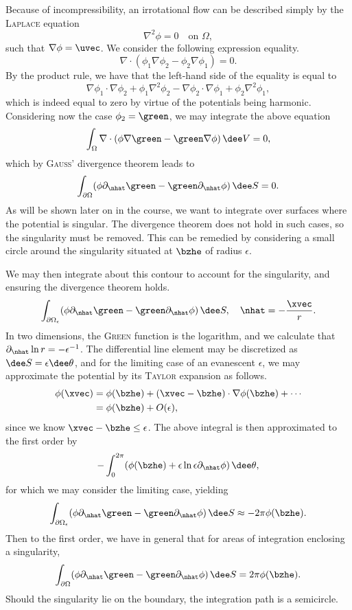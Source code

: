 Because of incompressibility, an irrotational flow can be described simply by the \textsc{Laplace} equation
\[
    \nabla^2 \phi = 0 \quad \text{on } \Omega,
\]
such that $\nabla\phi = \uvec$.
We consider the following expression equality.
\[
    \nabla\cdot(\phi_1 \nabla\phi_2 - \phi_2 \nabla\phi_1) = 0.
\]
By the product rule, we have that the left-hand side of the equality is equal to
\[
    \nabla\phi_1 \cdot \nabla\phi_2 + \phi_1 \nabla^2 \phi_2 - \nabla\phi_2 \cdot \nabla\phi_1 + \phi_2 \nabla^2 \phi_1,
\]
which is indeed equal to zero by virtue of the potentials being harmonic.
Considering now the case $\phi_2 = \green$, we may integrate the above equation
\[
    \int_{\Omega} \nabla\cdot(\phi\nabla\green - \green\nabla\phi) \,\dee V = 0,
\]
which by \textsc{Gau\ss}' divergence theorem leads to
\[
    \int_{\partial\Omega} (\phi\partial_{\nhat} \green - \green \partial_{\nhat} \phi) \,\dee S = 0.
\]
As will be shown later on in the course, we want to integrate over surfaces where the potential is singular.
The divergence theorem does not hold in such cases, so the singularity must be removed.
This can be remedied by considering a small circle around the singularity situated at $\bzhe$ of radius $\epsilon$.
\begin{figure}[H]
    \centering
    
\end{figure}

\noindent We may then integrate about this contour to account for the singularity, and ensuring the divergence theorem holds.
\[
    \int_{\partial\Omega_{\epsilon}} (\phi \partial_{\nhat} \green - \green \partial_{\nhat} \phi) \,\dee S, \quad \nhat = -\frac{\xvec}{r}.
\]
In two dimensions, the \textsc{Green} function is the logarithm, and we calculate that $\partial_{\nhat} \ln{r} = -\epsilon^{-1}$.
The differential line element may be discretized as $\dee S = \epsilon \dee\theta$, and for the limiting case of an evanescent $\epsilon$, we may approximate the potential by its \textsc{Taylor} expansion as follows.
\begin{equation*}
    \begin{aligned}
        \phi(\xvec) & = \phi(\bzhe) + (\xvec - \bzhe)\cdot\nabla\phi(\bzhe) + \cdots\\
        & = \phi(\bzhe) + O(\epsilon),
    \end{aligned}
\end{equation*}
since we know $\xvec - \bzhe \leq \epsilon$.
The above integral is then approximated to the first order by
\[
    -\int_{0}^{2\pi} (\phi(\bzhe) + \epsilon \ln{\epsilon} \partial_{\nhat} \phi) \,\dee\theta,
\]
for which we may consider the limiting case, yielding
\[
    \int_{\partial\Omega_{\epsilon}} (\phi \partial_{\nhat} \green - \green \partial_{\nhat} \phi) \,\dee S \approx -2\pi\phi(\bzhe).
\]
Then to the first order, we have in general that for areas of integration enclosing a singularity,
\[
    \int_{\partial\Omega} (\phi \partial_{\nhat} \green - \green \partial_{\nhat} \phi) \,\dee S = 2\pi\phi(\bzhe).
\]
Should the singularity lie on the boundary, the integration path is a semicircle.
\begin{figure}[H]
    \centering
    
\end{figure}

